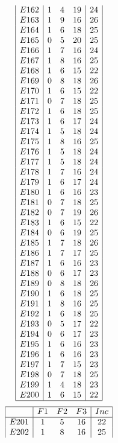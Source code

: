\documentclass[12pt]{article}
\begin{document}
\begin{multicols}{3}
\begin{equation*}
\begin{array}{|c|ccc|c|}
E162&1&4&19&24\\
E163&1&9&16&26\\
E164&1&6&18&25\\
E165&0&5&20&25\\
E166&1&7&16&24\\
E167&1&8&16&25\\
E168&1&6&15&22\\
E169&0&8&18&26\\
E170&1&6&15&22\\
E171&0&7&18&25\\
E172&1&6&18&25\\
E173&1&6&17&24\\
E174&1&5&18&24\\
E175&1&8&16&25\\
E176&1&5&18&24\\
E177&1&5&18&24\\
E178&1&7&16&24\\
E179&1&6&17&24\\
E180&1&6&16&23\\
E181&0&7&18&25\\
E182&0&7&19&26\\
E183&1&6&15&22\\
E184&0&6&19&25\\
E185&1&7&18&26\\
E186&1&7&17&25\\
E187&1&6&16&23\\
E188&0&6&17&23\\
E189&0&8&18&26\\
E190&1&6&18&25\\
E191&1&8&16&25\\
E192&1&6&18&25\\
E193&0&5&17&22\\
E194&0&6&17&23\\
E195&1&6&16&23\\
E196&1&6&16&23\\
E197&1&7&15&23\\
E198&0&7&18&25\\
E199&1&4&18&23\\
E200&1&6&15&22\\
\hline
\end{array}
\end{equation*}
\begin{equation*}
\begin{array}{|c|ccc|c|}
\hline
&F1&F2&F3&Inc\\
\hline
E201&1&5&16&22\\
E202&1&8&16&25\\

\end{array}
\end{equation*}
\end{multicols}
\end{document}
